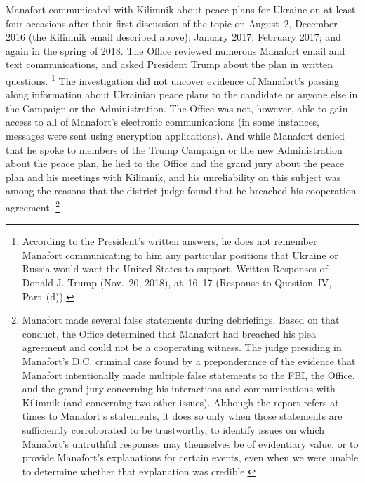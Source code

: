 Manafort communicated with Kilimnik about peace plans for Ukraine on at least four occasions after their first discussion of the topic on August~2, December 2016 (the Kilimnik email described above); January 2017; February 2017; and again in the spring of 2018.
The Office reviewed numerous Manafort email and text communications, and asked President Trump about the plan in written questions.%
\footnote{According to the President's written answers, he does not remember Manafort communicating to him any particular positions that Ukraine or Russia would want the United States to support.
Written Responses of Donald J. Trump (Nov.~20, 2018), at~16--17 (Response to Question~IV, Part~(d)).}
The investigation did not uncover evidence of Manafort's passing along information about Ukrainian peace plans to the candidate or anyone else in the Campaign or the Administration.
The Office was not, however, able to gain access to all of Manafort's electronic communications (in some instances, messages were sent using encryption applications).
And while Manafort denied that he spoke to members of the Trump Campaign or the new Administration about the peace plan, he lied to the Office and the grand jury about the peace plan and his meetings with Kilimnik, and his unreliability on this subject was among the reasons that the district judge found that he breached his cooperation agreement.%
\footnote{Manafort made several false statements during debriefings. Based on that conduct, the Office determined that Manafort had breached his plea agreement and could not be a cooperating witness. The judge presiding in Manafort's D.C. criminal case found by a preponderance of the evidence that Manafort intentionally made multiple false statements to the FBI, the Office, and the grand jury concerning his interactions and communications with Kilimnik (and concerning two other issues). Although the report refers at times to Manafort's statements, it does so only when those statements are sufficiently corroborated to be trustworthy, to identify issues on which Manafort's untruthful responses may themselves be of evidentiary value, or to provide Manafort's explanations for certain events, even when we were unable to determine whether that explanation was credible.}

